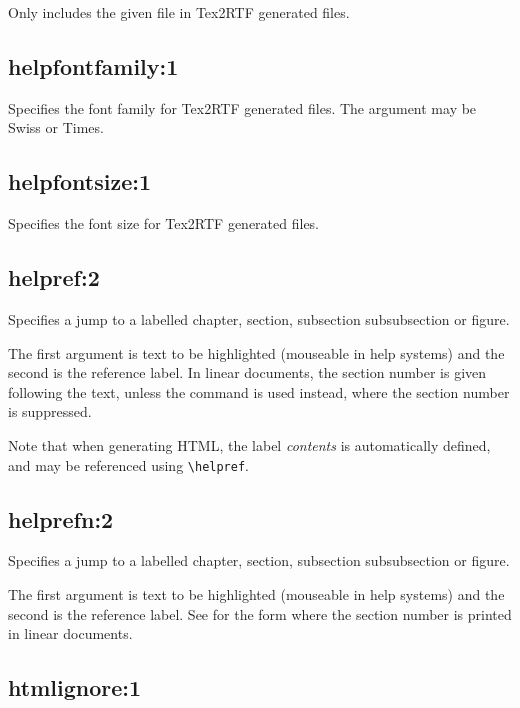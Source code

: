 Only includes the given file in Tex2RTF generated files.

\subsection*{helpfontfamily:1}\label{helpfontfamily}

Specifies the font family for Tex2RTF generated files. The argument
may be Swiss or Times.

\subsection*{helpfontsize:1}\label{helpfontsize}

Specifies the font size for Tex2RTF generated files.

\subsection*{helpref:2}\label{helpref}

Specifies a jump to a labelled chapter, section, subsection subsubsection
or figure.

The first argument is text to be highlighted (mouseable in help systems)
and the second is the reference label. In linear documents, the section number
is given following the text, unless the  command
is used instead, where the section number is suppressed.

Note that when generating HTML, the label {\it contents} is automatically defined,
and may be referenced using \verb$\helpref$.

\subsection*{helprefn:2}\label{helprefn}

Specifies a jump to a labelled chapter, section, subsection subsubsection
or figure.

The first argument is text to be highlighted (mouseable in help systems)
and the second is the reference label.  See  for
the form where the section number is printed in linear documents.

\subsection*{htmlignore:1}\label{htmlignore}

